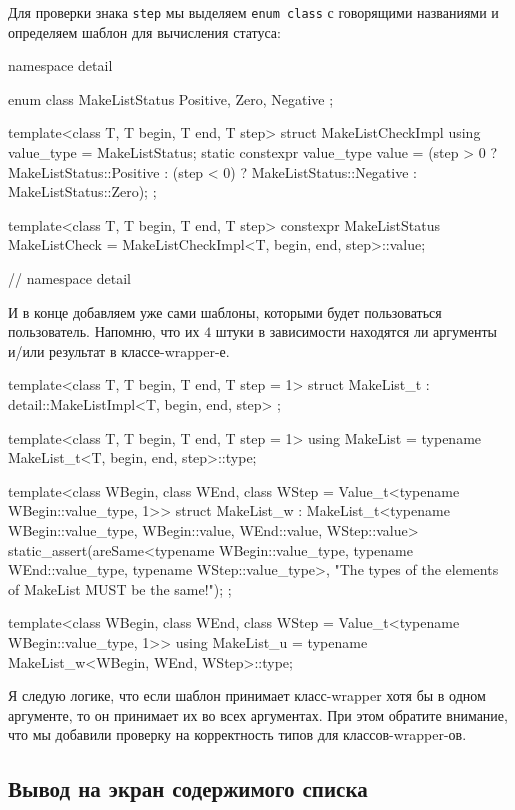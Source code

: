 Для проверки знака \verb"step" мы выделяем \verb"enum class" с говорящими названиями и определяем шаблон для вычисления статуса:
\begin{cppcode}
namespace detail {
enum class MakeListStatus { Positive, Zero, Negative };

template<class T, T begin, T end, T step>
struct MakeListCheckImpl {
  using value_type = MakeListStatus;
  static constexpr value_type value = (step > 0     ? MakeListStatus::Positive
                                       : (step < 0) ? MakeListStatus::Negative
                                                    : MakeListStatus::Zero);
};

template<class T, T begin, T end, T step>
constexpr MakeListStatus MakeListCheck =
    MakeListCheckImpl<T, begin, end, step>::value;
} // namespace detail
\end{cppcode}
И в конце добавляем уже сами шаблоны, которыми будет пользоваться пользователь.
Напомню, что их $4$ штуки в зависимости находятся ли аргументы и/или результат в классе-wrapper-е.
\begin{cppcode}
template<class T, T begin, T end, T step = 1>
struct MakeList_t : detail::MakeListImpl<T, begin, end, step> {};

template<class T, T begin, T end, T step = 1>
using MakeList = typename MakeList_t<T, begin, end, step>::type;

template<class WBegin, class WEnd,
         class WStep = Value_t<typename WBegin::value_type, 1>>
struct MakeList_w : MakeList_t<typename WBegin::value_type, WBegin::value,
                               WEnd::value, WStep::value> {
  static_assert(areSame<typename WBegin::value_type, typename WEnd::value_type,
                        typename WStep::value_type>,
                "The types of the elements of MakeList MUST be the same!");
};

template<class WBegin, class WEnd,
         class WStep = Value_t<typename WBegin::value_type, 1>>
using MakeList_u = typename MakeList_w<WBegin, WEnd, WStep>::type;
\end{cppcode}
Я следую логике, что если шаблон принимает класс-wrapper хотя бы в одном аргументе, то он принимает их во всех аргументах.
При этом обратите внимание, что мы добавили проверку на корректность типов для классов-wrapper-ов.

\subsection{Вывод на экран содержимого списка}

